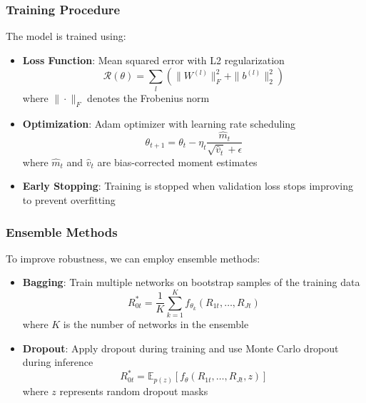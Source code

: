\documentclass[12pt,article]{memoir}
\begin{document}
\subsubsection{Training Procedure}
The model is trained using:
\begin{itemize}
   \item \textbf{Loss Function}: Mean squared error with L2 regularization
   $$\mathcal{R}(\theta) = \sum_{l} (\|W^{(l)}\|_F^2 + \|b^{(l)}\|_2^2)$$
   where $\|\cdot\|_F$ denotes the Frobenius norm
   
   \item \textbf{Optimization}: Adam optimizer with learning rate scheduling
   $$\theta_{t+1} = \theta_t - \eta_t \frac{\hat{m}_t}{\sqrt{\hat{v}_t} + \epsilon}$$
   where $\hat{m}_t$ and $\hat{v}_t$ are bias-corrected moment estimates
   
   \item \textbf{Early Stopping}: Training is stopped when validation loss stops improving to prevent overfitting
\end{itemize}

\subsubsection{Ensemble Methods}
To improve robustness, we can employ ensemble methods:

\begin{itemize}
   \item \textbf{Bagging}: Train multiple networks on bootstrap samples of the training data
   $$R_{0t}^* = \frac{1}{K}\sum_{k=1}^K f_{\theta_k}(R_{1t},\ldots,R_{Jt})$$
   where $K$ is the number of networks in the ensemble
   
   \item \textbf{Dropout}: Apply dropout during training and use Monte Carlo dropout during inference
   $$R_{0t}^* = \mathbb{E}_{p(z)}[f_{\theta}(R_{1t},\ldots,R_{Jt},z)]$$
   where $z$ represents random dropout masks
\end{itemize}
\end{document}
